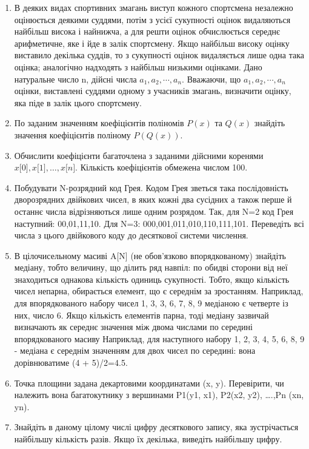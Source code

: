 \documentclass[]{article}
\begin{document}
\begin{enumerate}
\item
  В деяких видах спортивних змагань виступ кожного спортсмена незалежно
  оцінюється деякими суддями, потім з усієї сукупності оцінок
  видаляються найбільш висока і найнижча, а для решти оцінок
  обчислюється середнє арифметичне, яке і йде в залік спортсмену. Якщо
  найбільш високу оцінку виставило декілька суддів, то з сукупності
  оцінок видаляється лише одна така оцінка; аналогічно надходять з
  найбільш низькими оцінками. Дано натуральне число n, дійсні числа
  \(a_{1},a_{2},\cdots,a_{n}\). Вважаючи, що
  \(a_{1},a_{2},\cdots,a_{n}\)оцінки, виставлені суддями одному з
  учасників змагань, визначити оцінку, яка піде в залік цього
  спортсмену.
\item
По заданим значенням коефіцієнтів поліномів $P(x)$ та $Q(x)$ знайдіть
значення коефіцієнтів поліному $P(Q(x))$.
\item
  Обчислити коефіцієнти багаточлена з заданими дійсними коренями 
$ x{[}0{]},x{[}1{]}, \ldots{}, x{[}n{]}$. Кількість коефіцієнтів обмежена
  числом 100.
\item
  Побудувати N-розрядний код Грея. Кодом Грея зветься така послідовність
  дворозрядних двійкових чисел, в яких кожні два сусідних а також перше
  й останнє числа відрізняються лише одним розрядом. Так, для N=2 код
  Грея наступний: 00,01,11,10. Для N=3: 000,001,011,010,110,111,101.
  Переведіть всі числа з цього двійкового коду до десяткової системи
  числення.
\item
  В цілочисельному масиві A{[}N{]} (не обов'язково впорядкованому)
  знайдіть медіану, тобто величину, що ділить ряд навпіл: по обидві
  сторони від неї знаходиться однакова кількість одиниць сукупності.
  Тобто, якщо кількість чисел непарна, обирається елемент, що є середнім
  за зростанням. Наприклад, для впорядкованого набору чисел 1, 3, 3, 6,
  7, 8, 9 медіаною є четверте із них, число 6. Якщо кількість елементів
  парна, тоді медіану зазвичай визначають як середнє значення між двома
  числами по середині впорядкованого масиву Наприклад, для наступного
  набору 1, 2, 3, 4, 5, 6, 8, 9 - медіана є середнім значенням для двох
  чисел по середині: вона дорівнюватиме (4 + 5)/2=4.5.
\item
Точка площини задана декартовими координатами (x, y). Перевірити, чи
належить вона багатокутнику з вершинами P1(y1, x1), P2(x2, y2),
\ldots{}.,Pn (xn, yn).
\item
Знайдіть в даному цілому числі цифру десяткового запису, яка
зустрічається найбільшу кількість разів. Якщо їх декілька, виведіть
найбільшу цифру.


\end{enumerate}
\end{document}
